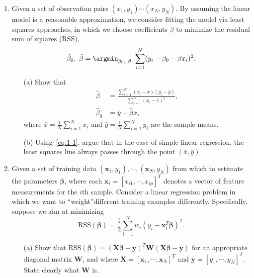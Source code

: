 \documentclass[10pt]{article}
\begin{document}
\begin{enumerate}[1.]
        \item  Given a set of observation pairs $(x_{1},y_{1})\cdots(x_{N},y_{N})$. By assuming the linear model is a reasonable approximation, we consider fitting the model via least squares approaches, in which we choose coefficients $\beta$ to minimize the residual sum of squares (RSS), 
        \begin{equation*}\label{eq:1}
        	\hat{\beta}_{0},~ \hat{\beta} = \argmin_{\beta_{0},~ \beta}~ \sum_{i=1}^{N}(y_{i} -\beta_{0}-\beta x_{i})^{2}.
        \end{equation*} 
        \begin{itemize}
			\item[(a)] Show that 
			\begin{equation}\label{eq:1-1}
			\begin{aligned}
			\hat{\beta} &= \tfrac{\sum_{i=1}^{N}(x_{i}-\bar{x})(y_{i}-\bar{y})}{\sum_{i=1}^{N}(x_{i}-\bar{x})^{2}},\\
			\hat{\beta}_{0} &= \bar{y} -\hat{\beta}\bar{x},
			\end{aligned}
			\end{equation}
			where $\bar{x} = \tfrac{1}{N}\sum_{i=1}^{N}x_{i}$ and $\bar{y} = \tfrac{1}{N}\sum_{i=1}^{N}y_{i}$ are the sample means.~
			
			\item[(b)] Using~\eqref{eq:1-1}, argue that in the case of simple linear regression, the
least squares line always passes through the point $(\bar{x},\bar{y})$.~
        \end{itemize}
        
        


        \item  Given a set of training data $(\bm{x}_{1},y_1),\cdots,(\bm{x}_{N},y_N)$ from which to estimate the parameters $\bm{\beta}$, where each $\bm{x}_{i} = \left[x_{i1},\cdots,x_{ip} \right]^{T}$ denotes a vector of feature measurements for the $i$th sample. Consider a linear regression problem in which we want to \textquotedblleft weight\textquotedblright different training examples differently. Specifically, suppose we aim at minimizing
        \begin{equation}\label{eq: 2-1}
        	\textrm{RSS}(\bm{\beta}) = \frac{1}{2}\sum_{i=1}^{N}w_{i}(y_{i} -\bm{x}_{i}^{T}\bm{\beta})^{2}.
        \end{equation}
        \begin{itemize}
        	\item[(a)] Show that $\textrm{RSS}(\bm{\beta}) = (\bm{X}\bm{\beta} - \bm{y})^{T}\bm{W}(\bm{X}\bm{\beta}-\bm{y})$
        	for an appropriate diagonal matrix $\bm{W}$, and where $\bm{X} = \left[\bm{x}_{1},\cdots,\bm{x}_{N} \right]^{T}$ and $\bm{y} = \left[y_1,\cdots,y_N \right]^{T}$. State clearly what $\bm{W}$ is. ~
        	

\end{itemize}
\end{enumerate}
\end{document}
